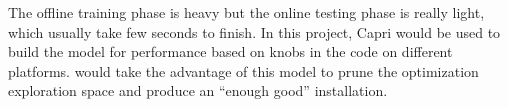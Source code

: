   The offline training phase is heavy but the online testing phase is really
  light, which usually take few seconds to finish. In this project, Capri would
  be used to build the model for \gem performance based on knobs in the code on
  different platforms. \atl would take the advantage of this model to prune
  the optimization exploration space and produce an ``enough good'' \gem
  installation.


